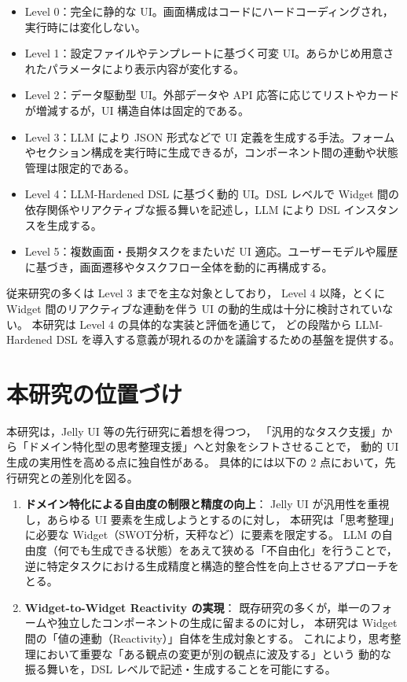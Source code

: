 \documentclass[senior,final,11pt,dvipdfmx]{iputit-thesis}
\begin{document}
\begin{itemize}
  \item Level 0：完全に静的な UI。画面構成はコードにハードコーディングされ，実行時には変化しない。
  \item Level 1：設定ファイルやテンプレートに基づく可変 UI。あらかじめ用意されたパラメータにより表示内容が変化する。
  \item Level 2：データ駆動型 UI。外部データや API 応答に応じてリストやカードが増減するが，UI 構造自体は固定的である。
  \item Level 3：LLM により JSON 形式などで UI 定義を生成する手法。フォームやセクション構成を実行時に生成できるが，コンポーネント間の連動や状態管理は限定的である。
  \item Level 4：LLM-Hardened DSL に基づく動的 UI。DSL レベルで Widget 間の依存関係やリアクティブな振る舞いを記述し，LLM により DSL インスタンスを生成する。
  \item Level 5：複数画面・長期タスクをまたいだ UI 適応。ユーザーモデルや履歴に基づき，画面遷移やタスクフロー全体を動的に再構成する。
\end{itemize}

従来研究の多くは Level 3 までを主な対象としており，
Level 4 以降，とくに Widget 間のリアクティブな連動を伴う UI の動的生成は十分に検討されていない。
本研究は Level 4 の具体的な実装と評価を通じて，
どの段階から LLM-Hardened DSL を導入する意義が現れるのかを議論するための基盤を提供する。


\section{本研究の位置づけ}

本研究は，Jelly UI 等の先行研究\cite{cao2025jelly}に着想を得つつ，
「汎用的なタスク支援」から「ドメイン特化型の思考整理支援」へと対象をシフトさせることで，
動的 UI 生成の実用性を高める点に独自性がある。
具体的には以下の 2 点において，先行研究との差別化を図る。

\begin{enumerate}
  \item \textbf{ドメイン特化による自由度の制限と精度の向上}：
        Jelly UI が汎用性を重視し，あらゆる UI 要素を生成しようとするのに対し，
        本研究は「思考整理」に必要な Widget（SWOT分析，天秤など）に要素を限定する。
        LLM の自由度（何でも生成できる状態）をあえて狭める「不自由化」を行うことで，
        逆に特定タスクにおける生成精度と構造的整合性を向上させるアプローチをとる。
        
  \item \textbf{Widget-to-Widget Reactivity の実現}：
        既存研究の多くが，単一のフォームや独立したコンポーネントの生成に留まるのに対し，
        本研究は Widget 間の「値の連動（Reactivity）」自体を生成対象とする。
        これにより，思考整理において重要な「ある観点の変更が別の観点に波及する」という
        動的な振る舞いを，DSL レベルで記述・生成することを可能にする。
\end{enumerate}
\end{document}
